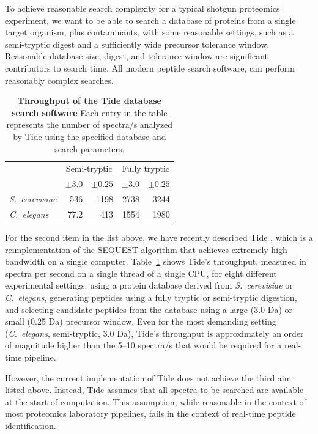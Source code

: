\documentclass[12pt]{article}
\begin{document}
To achieve reasonable search complexity for a typical shotgun
proteomics experiment, we want to be able to search a database of
proteins from a single target organism, plus contaminants, with some
reasonable settings, such as a semi-tryptic digest and a sufficiently
wide precursor tolerance window. Reasonable database size, digest, and
tolerance window are significant contributors to search time. All
modern peptide search software, can perform reasonably complex
searches.

\begin{table}
\small
\centering
\begin{tabular}{lrrrr}
& \multicolumn{2}{c}{Semi-tryptic}
& \multicolumn{2}{c}{Fully tryptic} \\
& $\pm 3.0$ & $\pm 0.25$ & $\pm 3.0$ & $\pm 0.25$ \\
\hline
{\em S.\ cerevisiae}  & 536  & 1198 & 2738 & 3244 \\
{\em C.\ elegans}     & 77.2 &  413 & 1554 & 1980 \\
\end{tabular}
\caption{{\bf Throughput of the Tide database search software} Each
  entry in the table represents the number of spectra/s analyzed by
  Tide using the specified database and search parameters.
  \label{table:tide}}
\end{table}

For the second item in the list above, we have recently described Tide
\cite{diament:faster}, which is a reimplementation of the SEQUEST
algorithm \cite{eng:approach} that achieves extremely high bandwidth
on a single computer.  Table~\ref{table:tide} shows Tide's throughput,
measured in spectra per second on a single thread of a single CPU, for
eight different experimental settings: using a protein database
derived from {\em S.\ cerevisiae} or {\em C.\ elegans}, generating
peptides using a fully tryptic or semi-tryptic digestion, and
selecting candidate peptides from the database using a large (3.0 Da)
or small (0.25 Da) precursor window.  Even for the most demanding
setting ({\em C.\ elegans}, semi-tryptic, 3.0 Da), Tide's throughput
is approximately an order of magnitude higher than the 5--10 spectra/s
that would be required for a real-time pipeline.

However, the current implementation of Tide does not achieve the third
aim listed above.  Instead, Tide assumes that all spectra to be
searched are available at the start of computation. This assumption,
while reasonable in the context of most proteomics laboratory
pipelines, fails in the context of real-time peptide identification.
\end{document}
